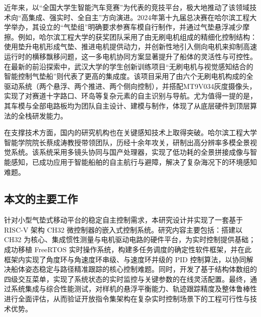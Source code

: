 近年来，以“全国大学生智能汽车竞赛”为代表的竞技平台，极大地推动了该领域技术向“高集成、强实时、全自主”方向演进。2024年第十九届总决赛在哈尔滨工程大学举办，其设立的“气垫组”明确要求参赛车模自行制作，并通过气垫悬浮减少摩擦。例如，哈尔滨工程大学的获奖团队采用了由无刷电机组成的精细化控制结构：使用垫升电机形成气垫、推进电机提供动力，并创新性地引入侧向电机来抑制高速运行时的横移飘移问题，这一多电机协同方案显著提升了船体的灵活性与可控性。在最新的前沿探索中，武汉大学的学生创新训练项目“无刷电机与视觉感知结合的智能控制气垫船”则代表了更高的集成度。该项目采用了由六个无刷电机构成的全驱动系统（两个悬浮、两个推进、两个侧向控制），并搭配MT9V034灰度摄像头，实现了对赛道十字路口、环岛等复杂元素的自主识别与导航。尤为值得一提的是，其车模与全部电路板均为团队自主设计、建模与制作，体现了从底层硬件到顶层算法的全栈研发能力。

在支撑技术方面，国内的研究机构也在关键感知技术上取得突破。哈尔滨工程大学智能学院院长蔡成涛教授带领团队，历经十余年攻关，研制出高分辨率多模全景视觉系统。该系统采用多镜头协同与国产处理器，实现了低功耗的全景拼接成像与智能感知，已成功应用于智能船舶的自主航行与避障，解决了复杂海况下的环境感知难题。
\subsection{本文的主要工作}
针对小型气垫式移动平台的稳定自主控制需求，本研究设计并实现了一套基于 RISC-V 架构 CH32 微控制器的嵌入式控制系统。研究内容主要包括：搭建以 CH32 为核心、集成惯性测量与电机驱动电路的硬件平台，为实时控制提供基础；成功移植 FreeRTOS 实时操作系统，构建多任务调度的确定性软件框架，并在此框架内实现了角度环与角速度环串级、与速度环并级的 PID 控制算法，以协同解决船体姿态稳定与路径精准跟踪的核心控制难题。同时，开发了基于结构体数组的四级交互菜单，实现了系统状态的实时监控与关键参数的在线灵活配置。最终，通过系统集成与综合性能测试，对样机的悬浮平衡能力、轨迹跟踪精度及整体鲁棒性进行全面评估，从而验证开放指令集架构在复杂实时控制场景下的工程可行性与技术优势。


